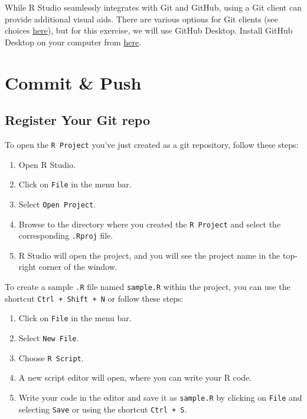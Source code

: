 \documentclass[
]{book}
\providecommand{\tightlist}{%
  \setlength{\itemsep}{0pt}\setlength{\parskip}{0pt}}
\begin{document}
While R Studio seamlessly integrates with Git and GitHub, using a Git client can provide additional visual aids. There are various options for Git clients (see choices \href{https://happygitwithr.com/git-client.html}{here}), but for this exercise, we will use GitHub Desktop. Install GitHub Desktop on your computer from \href{https://desktop.github.com/}{here}.

\hypertarget{commit-push}{%
\section{Commit \& Push}\label{commit-push}}

\hypertarget{register-your-git-repo}{%
\subsection{Register Your Git repo}\label{register-your-git-repo}}

To open the \texttt{R\ Project} you've just created as a git repository, follow these steps:

\begin{enumerate}
\def\labelenumi{\arabic{enumi}.}
\tightlist
\item
  Open R Studio.
\item
  Click on \texttt{File} in the menu bar.
\item
  Select \texttt{Open\ Project}.
\item
  Browse to the directory where you created the \texttt{R\ Project} and select the corresponding \texttt{.Rproj} file.
\item
  R Studio will open the project, and you will see the project name in the top-right corner of the window.
\end{enumerate}

To create a sample \texttt{.R} file named \texttt{sample.R} within the project, you can use the shortcut \texttt{Ctrl\ +\ Shift\ +\ N} or follow these steps:

\begin{enumerate}
\def\labelenumi{\arabic{enumi}.}
\tightlist
\item
  Click on \texttt{File} in the menu bar.
\item
  Select \texttt{New\ File}.
\item
  Choose \texttt{R\ Script}.
\item
  A new script editor will open, where you can write your R code.
\item
  Write your code in the editor and save it as \texttt{sample.R} by clicking on \texttt{File} and selecting \texttt{Save} or using the shortcut \texttt{Ctrl\ +\ S}.
\end{enumerate}
\end{document}
